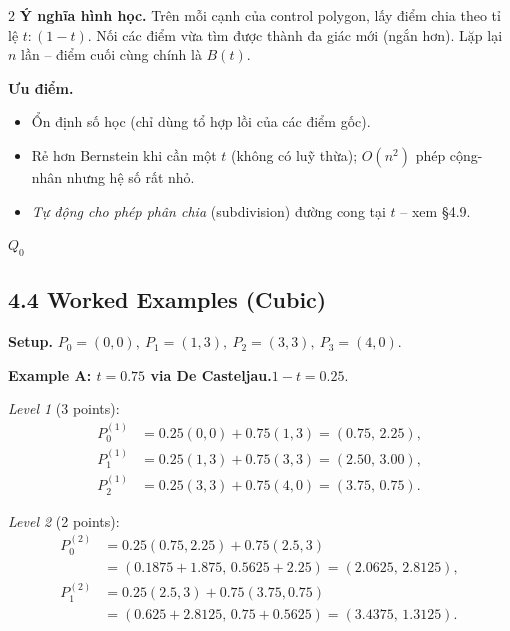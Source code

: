 \begin{paracol}{2}
\textbf{Ý nghĩa hình học.} Trên mỗi cạnh của control polygon, lấy điểm chia theo tỉ lệ $t:(1{-}t)$. Nối các điểm vừa tìm được thành đa giác mới (ngắn hơn). Lặp lại $n$ lần -- điểm cuối cùng chính là $B(t)$.

\textbf{Ưu điểm.}
\begin{itemize}[leftmargin=*,nosep]
  \item Ổn định số học (chỉ dùng tổ hợp lồi của các điểm gốc).
  \item Rẻ hơn Bernstein khi cần một $t$ (không có luỹ thừa); $O(n^{2})$ phép cộng-nhân nhưng hệ số rất nhỏ.
  \item \emph{Tự động cho phép phân chia} (subdivision) đường cong tại $t$ -- xem \S 4.9.
\end{itemize}

\begin{algorithm}[H]
\small
\DontPrintSemicolon
{}
\Return $Q_0$\;
\caption{De Casteljau (đường cong)}
\end{algorithm}

\switchcolumn*

\subsection*{4.4 Worked Examples (Cubic)}

\textbf{Setup.} $P_0=(0,0),\ P_1=(1,3),\ P_2=(3,3),\ P_3=(4,0)$.

\medskip
\textbf{Example A: $t=0.75$ via De Casteljau.}\quad $1{-}t=0.25$.

\emph{Level 1} (3 points):
\begin{align*}
P_0^{(1)} &= 0.25(0,0)+0.75(1,3)=(0.75,\,2.25),\\
P_1^{(1)} &= 0.25(1,3)+0.75(3,3)=(2.50,\,3.00),\\
P_2^{(1)} &= 0.25(3,3)+0.75(4,0)=(3.75,\,0.75).
\end{align*}

\emph{Level 2} (2 points):
\begin{align*}
P_0^{(2)} &= 0.25(0.75,2.25)+0.75(2.5,3)\\
          &= (0.1875+1.875,\,0.5625+2.25)=(2.0625,\,2.8125),\\
P_1^{(2)} &= 0.25(2.5,3)+0.75(3.75,0.75)\\
          &= (0.625+2.8125,\,0.75+0.5625)=(3.4375,\,1.3125).
\end{align*}


\end{paracol}
